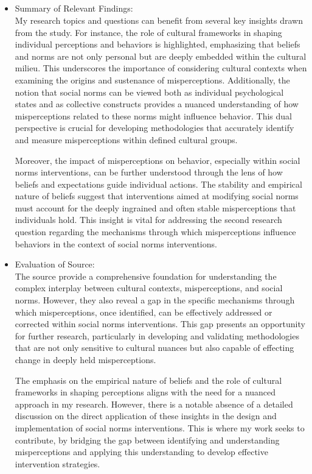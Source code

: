 \documentclass{article}
\begin{document}
\subsection{}
\begin{itemize}
    \item Summary of Relevant Findings:\\
My research topics and questions can benefit from several key insights drawn from the study. For instance, the role of cultural frameworks in shaping individual perceptions and behaviors is highlighted, emphasizing that beliefs and norms are not only personal but are deeply embedded within the cultural milieu. This underscores the importance of considering cultural contexts when examining the origins and sustenance of misperceptions. Additionally, the notion that social norms can be viewed both as individual psychological states and as collective constructs provides a nuanced understanding of how misperceptions related to these norms might influence behavior. This dual perspective is crucial for developing methodologies that accurately identify and measure misperceptions within defined cultural groups.

Moreover, the impact of misperceptions on behavior, especially within social norms interventions, can be further understood through the lens of how beliefs and expectations guide individual actions. The stability and empirical nature of beliefs suggest that interventions aimed at modifying social norms must account for the deeply ingrained and often stable misperceptions that individuals hold. This insight is vital for addressing the second research question regarding the mechanisms through which misperceptions influence behaviors in the context of social norms interventions.
\end{itemize}
\begin{itemize}
    \item Evaluation of Source:\\
The source provide a comprehensive foundation for understanding the complex interplay between cultural contexts, misperceptions, and social norms. However, they also reveal a gap in the specific mechanisms through which misperceptions, once identified, can be effectively addressed or corrected within social norms interventions. This gap presents an opportunity for further research, particularly in developing and validating methodologies that are not only sensitive to cultural nuances but also capable of effecting change in deeply held misperceptions.

The emphasis on the empirical nature of beliefs and the role of cultural frameworks in shaping perceptions aligns with the need for a nuanced approach in my research. However, there is a notable absence of a detailed discussion on the direct application of these insights in the design and implementation of social norms interventions. This is where my work seeks to contribute, by bridging the gap between identifying and understanding misperceptions and applying this understanding to develop effective intervention strategies.
\end{itemize}
\end{document}
